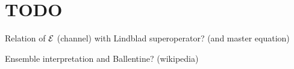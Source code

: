 \section{TODO}

Relation of $\mathcal{E}$ (channel) with Lindblad superoperator? (and master equation)

Ensemble interpretation and Ballentine? (wikipedia)
